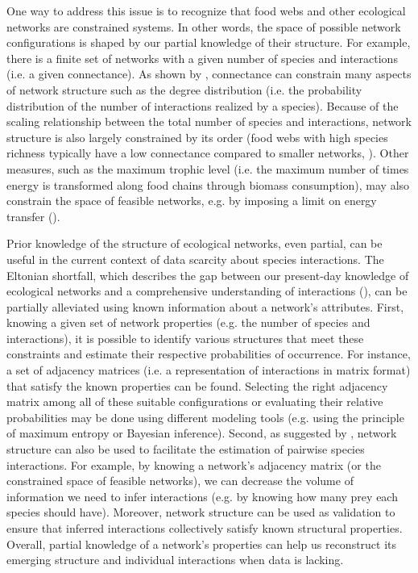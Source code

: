One way to address this issue is to recognize that food webs and other
ecological networks are constrained systems. In other words, the space of
possible network configurations is shaped by our partial knowledge of their
structure. For example, there is a finite set of networks with a given number of
species and interactions (i.e. a given connectance). As shown by
\textcite{Poisot2014When}, connectance can constrain many aspects of network
structure such as the degree distribution (i.e. the probability distribution of
the number of interactions realized by a species). Because of the scaling
relationship between the total number of species and interactions, network
structure is also largely constrained by its order (food webs with high species
richness typically have a low connectance compared to smaller networks,
\cite{MacDonald2020Revisiting}). Other measures, such as the maximum trophic level
(i.e. the maximum number of times energy is transformed along food chains
through biomass consumption), may also constrain the space of feasible networks,
e.g. by imposing a limit on energy transfer (\cite{Williams2004Limits}). 

Prior knowledge of the structure of ecological networks, even partial, can be
useful in the current context of data scarcity about species interactions. The
Eltonian shortfall, which describes the gap between our present-day knowledge of
ecological networks and a comprehensive understanding of interactions
(\cite{Hortal2015Seven}), can be partially alleviated using known information
about a network's attributes. First, knowing a given set of network properties
(e.g. the number of species and interactions), it is possible to identify
various structures that meet these constraints and estimate their respective
probabilities of occurrence. For instance, a set of adjacency matrices (i.e. a
representation of interactions in matrix format) that satisfy the known
properties can be found. Selecting the right adjacency matrix among all of these
suitable configurations or evaluating their relative probabilities may be done
using different modeling tools (e.g. using the principle of maximum entropy or
Bayesian inference). Second, as suggested by \textcite{Strydom2021Roadmapa}, network
structure can also be used to facilitate the estimation of pairwise species
interactions. For example, by knowing a network's adjacency matrix (or the
constrained space of feasible networks), we can decrease the volume of
information we need to infer interactions (e.g. by knowing how many prey each
species should have). Moreover, network structure can be used as validation to
ensure that inferred interactions collectively satisfy known structural
properties. Overall, partial knowledge of a network's properties can help us
reconstruct its emerging structure and individual interactions when data is
lacking. 

